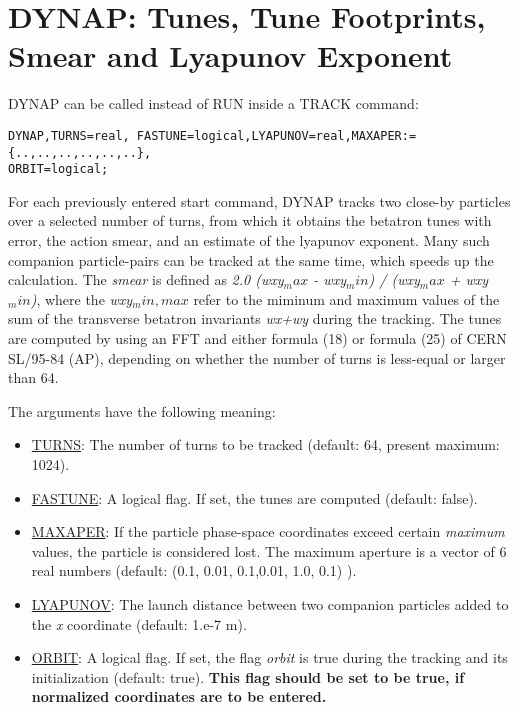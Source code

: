 
\chapter{DYNAP: Tunes, Tune Footprints, Smear and Lyapunov Exponent}

DYNAP can be called instead of RUN inside a TRACK command: 
\begin{verbatim}
DYNAP,TURNS=real, FASTUNE=logical,LYAPUNOV=real,MAXAPER:={..,..,..,..,..,..},
ORBIT=logical;
\end{verbatim}
 
For each previously entered start command, DYNAP tracks two close-by particles over a selected number of turns, from which it obtains the betatron tunes with error, the action smear, and an estimate of  the lyapunov exponent. Many such companion particle-pairs can be tracked at the same time, which speeds up the calculation. The \textit{ smear } is defined as  \textit{2.0 (wxy$_max$ - wxy$_min$) / (wxy$_max$ + wxy $_min$)}, where the \textit{wxy$_min,max$} refer to the  miminum and maximum values of the sum of the transverse betatron invariants \textit{wx+wy} during the tracking. The tunes are computed by  using an FFT and either formula (18) or formula (25) of CERN SL/95-84 (AP), depending on whether the number of turns is less-equal or larger than 64.
 
The arguments have the following meaning:
 
\begin{itemize}
	\item \href{particle}{TURNS}:
 The number of turns to be tracked (default: 64, present maximum: 1024).
 
	\item \href{particle}{FASTUNE}:
 A logical flag. If set, the tunes are computed (default: false).
 
	\item \href{particle}{MAXAPER}:
 If the particle phase-space coordinates exceed certain 
 \textit{ maximum }
 values, the particle is considered lost. The maximum aperture
 is a vector of 6 real numbers 
 (default: (0.1, 0.01, 0.1,0.01, 1.0, 0.1) ).
 
	\item \href{particle}{LYAPUNOV}:
 The launch distance 
 between two companion particles 
 added to the \textit{x} coordinate (default: 1.e-7 m).
 
	\item \href{particle}{ORBIT}:
 A logical flag. If set, the flag \textit{orbit} 
 is true during the tracking and its initialization
 (default: true).
 \textbf{ This flag should be set to be true, if 
 normalized coordinates are to be entered.}
\end{itemize}

